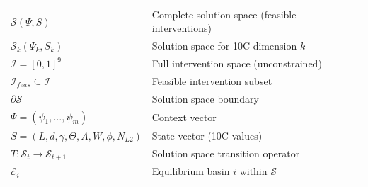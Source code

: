 \begin{abstract}
This appendix formalizes the \textbf{Solution Space} $\mathcal{S}(\Psi, S)$ -- the set of feasible interventions given context $\Psi$ and state $S$. While Appendix UNMAPPED_MP defines WHAT we optimize (objective function $P_{eff}$), this appendix defines WHERE we can optimize (the feasible region). The solution space is not fixed but \textbf{endogenously determined} by context and dynamically evolves as behavior changes context. We formalize: (1) Solution space per 10C dimension, (2) Context-dependent boundaries, (3) Intervention-induced space evolution, (4) The EMERGE algorithm as solution space generator, and (5) Multi-equilibria navigation within constrained spaces. This completes the formal optimization framework by specifying the constraint set referenced in MP's Bellman formulation.
\end{abstract}

\begin{tcolorbox}[colback=blue!5!white, colframe=blue!75!black, title=Quick Reference: Solution Space Notation]
\begin{tabular}{ll}
$\mathcal{S}(\Psi, S)$ & Complete solution space (feasible interventions) \\
$\mathcal{S}_k(\Psi_k, S_k)$ & Solution space for 10C dimension $k$ \\
$\mathcal{I} = [0,1]^9$ & Full intervention space (unconstrained) \\
$\mathcal{I}_{feas} \subseteq \mathcal{I}$ & Feasible intervention subset \\
$\partial \mathcal{S}$ & Solution space boundary \\
$\Psi = (\psi_1, \ldots, \psi_m)$ & Context vector \\
$S = (L, d, \gamma, \Theta, A, W, \phi, N_{L2})$ & State vector (10C values) \\
$T: \mathcal{S}_t \to \mathcal{S}_{t+1}$ & Solution space transition operator \\
$\mathcal{E}_i$ & Equilibrium basin $i$ within $\mathcal{S}$ \\
\end{tabular}
\end{tcolorbox}

